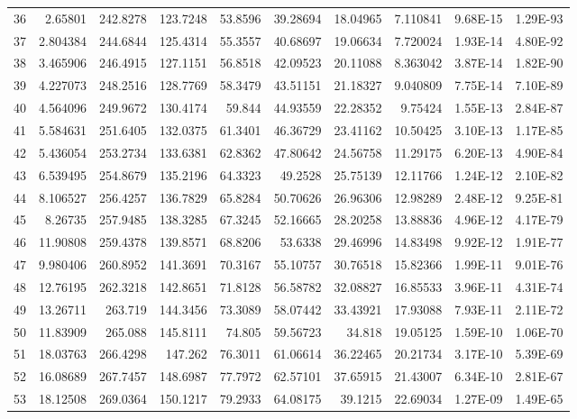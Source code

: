 \documentclass[a4paper]{article}
\begin{document}
{\begin{tabular}{|l|r|r|r|r|r|r|r|r|r|}
    {36} & 2.65801 & 242.8278 & 123.7248 & 53.8596 & 39.28694 & 18.04965 & 7.110841 & 9.68E-15 & 1.29E-93 \\
    {37} & 2.804384 & 244.6844 & 125.4314 & 55.3557 & 40.68697 & 19.06634 & 7.720024 & 1.93E-14 & 4.80E-92 \\
    {38} & 3.465906 & 246.4915 & 127.1151 & 56.8518 & 42.09523 & 20.11088 & 8.363042 & 3.87E-14 & 1.82E-90 \\
    {39} & 4.227073 & 248.2516 & 128.7769 & 58.3479 & 43.51151 & 21.18327 & 9.040809 & 7.75E-14 & 7.10E-89 \\
    {40} & 4.564096 & 249.9672 & 130.4174 & 59.844 & 44.93559 & 22.28352 & 9.75424 & 1.55E-13 & 2.84E-87 \\
    {41} & 5.584631 & 251.6405 & 132.0375 & 61.3401 & 46.36729 & 23.41162 & 10.50425 & 3.10E-13 & 1.17E-85 \\
    {42} & 5.436054 & 253.2734 & 133.6381 & 62.8362 & 47.80642 & 24.56758 & 11.29175 & 6.20E-13 & 4.90E-84 \\
    {43} & 6.539495 & 254.8679 & 135.2196 & 64.3323 & 49.2528 & 25.75139 & 12.11766 & 1.24E-12 & 2.10E-82 \\
    {44} & 8.106527 & 256.4257 & 136.7829 & 65.8284 & 50.70626 & 26.96306 & 12.98289 & 2.48E-12 & 9.25E-81 \\
    {45} & 8.26735 & 257.9485 & 138.3285 & 67.3245 & 52.16665 & 28.20258 & 13.88836 & 4.96E-12 & 4.17E-79 \\
    {46} & 11.90808 & 259.4378 & 139.8571 & 68.8206 & 53.6338 & 29.46996 & 14.83498 & 9.92E-12 & 1.91E-77 \\
    {47} & 9.980406 & 260.8952 & 141.3691 & 70.3167 & 55.10757 & 30.76518 & 15.82366 & 1.99E-11 & 9.01E-76 \\
    {48} & 12.76195 & 262.3218 & 142.8651 & 71.8128 & 56.58782 & 32.08827 & 16.85533 & 3.96E-11 & 4.31E-74 \\
    {49} & 13.26711 & 263.719 & 144.3456 & 73.3089 & 58.07442 & 33.43921 & 17.93088 & 7.93E-11 & 2.11E-72 \\
    {50} & 11.83909 & 265.088 & 145.8111 & 74.805 & 59.56723 & 34.818 & 19.05125 & 1.59E-10 & 1.06E-70 \\
    {51} & 18.03763 & 266.4298 & 147.262 & 76.3011 & 61.06614 & 36.22465 & 20.21734 & 3.17E-10 & 5.39E-69 \\
    {52} & 16.08689 & 267.7457 & 148.6987 & 77.7972 & 62.57101 & 37.65915 & 21.43007 & 6.34E-10 & 2.81E-67 \\
    {53} & 18.12508 & 269.0364 & 150.1217 & 79.2933 & 64.08175 & 39.1215 & 22.69034 & 1.27E-09 & 1.49E-65 \\

\end{tabular}}
\end{document}
